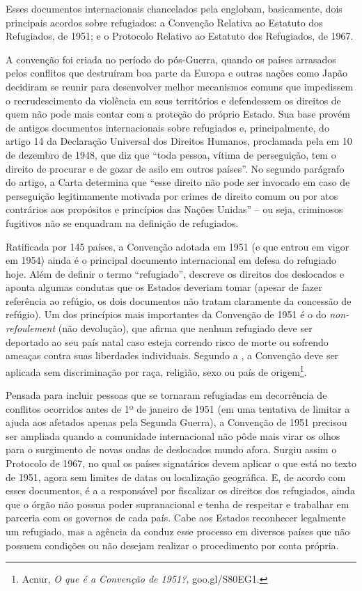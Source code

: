 Esses documentos internacionais chancelados pela  englobam,
basicamente, dois principais acordos sobre refugiados: a Convenção
Relativa ao Estatuto dos Refugiados, de 1951; e o Protocolo Relativo ao
Estatuto dos Refugiados, de 1967.

A convenção foi criada no período do pós-Guerra, quando os países
arrasados pelos conflitos que destruíram boa parte da Europa e outras
nações como Japão decidiram se reunir para desenvolver melhor mecanismos
comuns que impedissem o recrudescimento da violência em seus territórios
e defendessem os direitos de quem não pode mais contar com a proteção do
próprio Estado. Sua base provém de antigos documentos internacionais
sobre refugiados e, principalmente, do artigo 14 da Declaração Universal
dos Direitos Humanos, proclamada pela  em 10 de dezembro de 1948, que
diz que ``toda pessoa, vítima de perseguição, tem o direito de procurar
e de gozar de asilo em outros países''. No segundo parágrafo do artigo,
a Carta determina que ``esse direito não pode ser invocado em caso de
perseguição legitimamente motivada por crimes de direito comum ou por
atos contrários aos propósitos e princípios das Nações Unidas'' -- ou
seja, criminosos fugitivos não se enquadram na definição de refugiados.

Ratificada por 145 países, a Convenção adotada em 1951 (e que entrou em
vigor em 1954) ainda é o principal documento internacional em defesa do
refugiado hoje. Além de definir o termo ``refugiado'', descreve os
direitos dos deslocados e aponta algumas condutas que os Estados
deveriam tomar (apesar de fazer referência ao refúgio, os dois
documentos não tratam claramente da concessão de refúgio). Um dos
princípios mais importantes da Convenção de 1951 é o do
\emph{non-refoulement} (não devolução), que afirma que nenhum refugiado
deve ser deportado ao seu país natal caso esteja correndo risco de morte
ou sofrendo ameaças contra suas liberdades individuais. Segundo a ,
a Convenção deve ser aplicada sem discriminação por raça, religião, sexo
ou país de origem\footnote{Acnur, \emph{O que é a
  Convenção de 1951?,}
  goo.gl/S80EG1.}.



Pensada para incluir pessoas que se tornaram refugiadas em decorrência
de conflitos ocorridos antes de 1º de janeiro de 1951 (em uma tentativa
de limitar a ajuda aos afetados apenas pela Segunda Guerra), a Convenção
de 1951 precisou ser ampliada quando a comunidade internacional não pôde
mais virar os olhos para o surgimento de novas ondas de deslocados mundo
afora. Surgiu assim o Protocolo de 1967, no qual os países signatários
devem aplicar o que está no texto de 1951, agora sem limites de datas ou
localização geográfica. E, de acordo com esses documentos, é a  a
responsável por fiscalizar os direitos dos refugiados, ainda que o órgão
não possua poder supranacional e tenha de respeitar e trabalhar em
parceria com os governos de cada país. Cabe aos Estados reconhecer
legalmente um refugiado, mas a agência da  conduz esse processo em
diversos países que não possuem condições ou não desejam realizar o
procedimento por conta própria.

